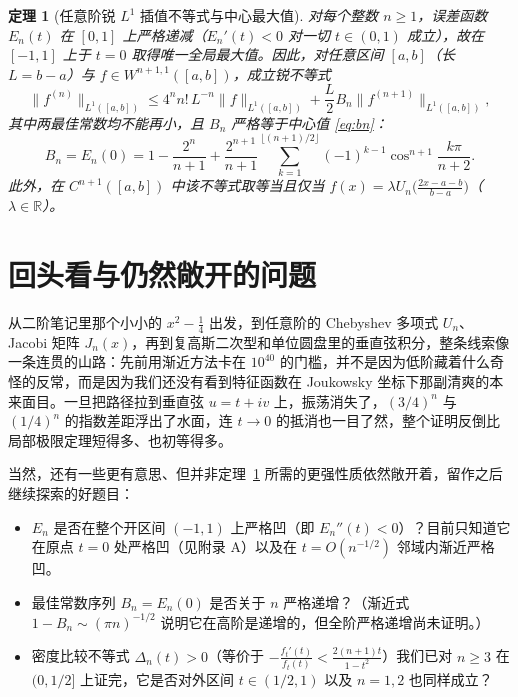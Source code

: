 \documentclass[UTF8,fontset=windows,a4paper,11pt]{ctexart}
\newcommand{\R}{\mathbb{R}}
\newtheorem{theorem}{定理}
\begin{document}
\begin{theorem}[任意阶锐 $L^1$ 插值不等式与中心最大值]
    \label{thm:full}
    对每个整数 $n\ge 1$，误差函数 $E_n(t)$ 在 $[0,1]$ 上严格递减（$E_n'(t)<0$ 对一切 $t\in(0,1)$ 成立），故在 $[-1,1]$ 上于 $t=0$ 取得唯一全局最大值。因此，对任意区间 $[a,b]$（长 $L=b-a$）与 $f\in W^{n+1,1}([a,b])$，成立锐不等式
    \[
        \lVert f^{(n)}\rVert_{L^1([a,b])}
        \le 4^n n!\,L^{-n}\lVert f\rVert_{L^1([a,b])}
          + \frac{L}{2}B_n\lVert f^{(n+1)}\rVert_{L^1([a,b])},
    \]
    其中两最佳常数均不能再小，且 $B_n$ 严格等于中心值 \eqref{eq:bn}：
    \[
        B_n = E_n(0)
        = 1 - \frac{2^n}{n+1} + \frac{2^{n+1}}{n+1}\sum_{k=1}^{\lfloor(n+1)/2\rfloor}(-1)^{k-1}\cos^{n+1}\frac{k\pi}{n+2}.
    \]
    此外，在 $C^{n+1}([a,b])$ 中该不等式取等当且仅当 $f(x)=\lambda U_n\bigl(\frac{2x-a-b}{b-a}\bigr)$（$\lambda\in\R$）。
\end{theorem}

\section{回头看与仍然敞开的问题}

从二阶笔记里那个小小的 $x^2-\frac14$ 出发，到任意阶的 Chebyshev 多项式 $U_n$、Jacobi 矩阵 $J_n(x)$，再到复高斯二次型和单位圆盘里的垂直弦积分，整条线索像一条连贯的山路：先前用渐近方法卡在 $10^{40}$ 的门槛，并不是因为低阶藏着什么奇怪的反常，而是因为我们还没有看到特征函数在 Joukowsky 坐标下那副清爽的本来面目。一旦把路径拉到垂直弦 $u=t+iv$ 上，振荡消失了，$(3/4)^n$ 与 $(1/4)^n$ 的指数差距浮出了水面，连 $t\to 0$ 的抵消也一目了然，整个证明反倒比局部极限定理短得多、也初等得多。

当然，还有一些更有意思、但并非定理~\ref{thm:full} 所需的更强性质依然敞开着，留作之后继续探索的好题目：
\begin{itemize}
    \item $E_n$ 是否在整个开区间 $(-1,1)$ 上严格凹（即 $E_n''(t)<0$）？目前只知道它在原点 $t=0$ 处严格凹（见附录 A）以及在 $t=O(n^{-1/2})$ 邻域内渐近严格凹。
    \item 最佳常数序列 $B_n=E_n(0)$ 是否关于 $n$ 严格递增？（渐近式 $1-B_n\sim(\pi n)^{-1/2}$ 说明它在高阶是递增的，但全阶严格递增尚未证明。）
    \item 密度比较不等式 $\Delta_n(t)>0$（等价于 $-\frac{f_t'(t)}{f_t(t)}<\frac{2(n+1)t}{1-t^2}$）我们已对 $n\ge 3$ 在 $(0,1/2]$ 上证完，它是否对外区间 $t\in(1/2,1)$ 以及 $n=1,2$ 也同样成立？
\end{itemize}

\appendix
\end{document}
